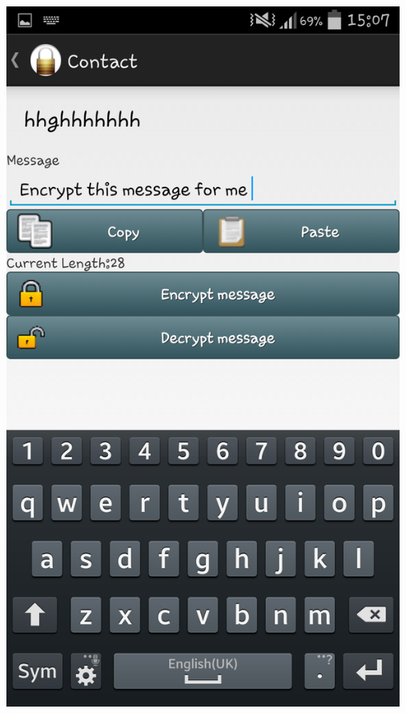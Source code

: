 \begin{center}
 \includegraphics[width=13cm]{screenshots/normal/5_ContactPreEncrypt.png}
\end{center}
